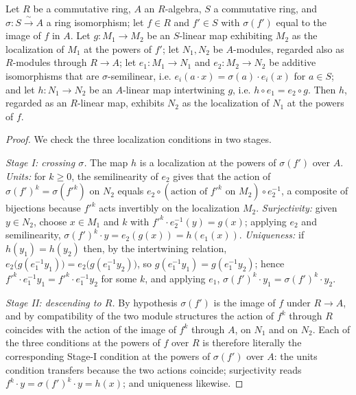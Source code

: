 \begin{lemma}
  \label{mk-lem:isLocalizedModule_powers_transport}
  \leanok

  Let \(R\) be a commutative ring, \(A\) an \(R\)-algebra, \(S\) a commutative ring, and
  \(\sigma : S \xrightarrow{\ \sim\ } A\) a ring isomorphism; let \(f \in R\) and
  \(f' \in S\) with \(\sigma(f')\) equal to the image of \(f\) in \(A\). Let
  \(g : M_1 \to M_2\) be an \(S\)-linear map exhibiting \(M_2\) as the localization of
  \(M_1\) at the powers of \(f'\); let \(N_1, N_2\) be \(A\)-modules, regarded also as
  \(R\)-modules through \(R \to A\); let \(e_1 : M_1 \to N_1\) and \(e_2 : M_2 \to N_2\)
  be additive isomorphisms that are \(\sigma\)-semilinear, i.e.
  \(e_i(a \cdot x) = \sigma(a) \cdot e_i(x)\) for \(a \in S\); and let
  \(h : N_1 \to N_2\) be an \(A\)-linear map intertwining \(g\), i.e.
  \(h \circ e_1 = e_2 \circ g\). Then \(h\), regarded as an \(R\)-linear map, exhibits
  \(N_2\) as the localization of \(N_1\) at the powers of \(f\).
\end{lemma}
\begin{proof}
  \leanok
  We check the three localization conditions in two stages.

  \emph{Stage I: crossing \(\sigma\).} The map \(h\) is a localization at the powers of
  \(\sigma(f')\) over \(A\).
  \emph{Units:} for \(k \ge 0\), the semilinearity of \(e_2\) gives that the action of
  \(\sigma(f')^k = \sigma(f'^k)\) on \(N_2\) equals
  \(e_2 \circ (\text{action of } f'^k \text{ on } M_2) \circ e_2^{-1}\), a composite of
  bijections because \(f'^k\) acts invertibly on the localization \(M_2\).
  \emph{Surjectivity:} given \(y \in N_2\), choose \(x \in M_1\) and \(k\) with
  \(f'^k \cdot e_2^{-1}(y) = g(x)\); applying \(e_2\) and semilinearity,
  \(\sigma(f')^k \cdot y = e_2(g(x)) = h(e_1(x))\).
  \emph{Uniqueness:} if \(h(y_1) = h(y_2)\) then, by the intertwining relation,
  \(e_2\bigl(g(e_1^{-1} y_1)\bigr) = e_2\bigl(g(e_1^{-1} y_2)\bigr)\), so
  \(g(e_1^{-1} y_1) = g(e_1^{-1} y_2)\); hence
  \(f'^k \cdot e_1^{-1} y_1 = f'^k \cdot e_1^{-1} y_2\) for some \(k\), and applying
  \(e_1\), \(\sigma(f')^k \cdot y_1 = \sigma(f')^k \cdot y_2\).

  \emph{Stage II: descending to \(R\).} By hypothesis \(\sigma(f')\) is the image of
  \(f\) under \(R \to A\), and by compatibility of the two module structures the action
  of \(f^k\) through \(R\) coincides with the action of the image of \(f^k\) through
  \(A\), on \(N_1\) and on \(N_2\). Each of the three conditions at the powers of \(f\)
  over \(R\) is therefore literally the corresponding Stage-I condition at the powers of
  \(\sigma(f')\) over \(A\): the units condition transfers because the two actions
  coincide; surjectivity reads \(f^k \cdot y = \sigma(f')^k \cdot y = h(x)\); and
  uniqueness likewise.
\end{proof}

